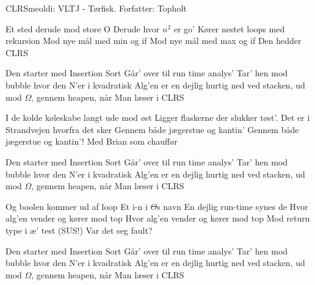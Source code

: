 \begin{sang}{CLRS}{meoldi: VLTJ - Tørfisk. Forfatter: Topholt}
    \begin{vers}
    Et sted derude mod store O
    Derude hvor $n^2$ er go'
    Kører nestet loops med rekursion
    Mod nye mål med min og if
    Mod nye mål med max og if
    Den hedder CLRS
    \end{vers}
    
    \begin{omkvaed}
    Den starter med Insertion Sort
    Går' over til run time analys' 
    Tar' hen mod bubble hvor den N'er i kvadratisk
    Alg'en er en dejlig hurtig ned ved stacken, ud mod $\Omega$, gennem heapen, når
    Man læser i CLRS
    \end{omkvaed}
    
    \begin{vers}
    I de kolde køleskabe langt ude mod øst
    Ligger flaskerne der slukker tøst'.
    Det er i Strandvejen hvorfra det sker
    Gennem både jægerstue og kantin'
    Gennem både jægerstue og kantin'!
    Med Brian som chauffør
    \end{vers}
    
    \begin{omkvaed}
    Den starter med Insertion Sort
    Går' over til run time analys' 
    Tar' hen mod bubble hvor den N'er i kvadratisk
    Alg'en er en dejlig hurtig ned ved stacken, ud mod $\Omega$, gennem heapen, når
    Man læser i CLRS
    \end{omkvaed}
    
    \begin{vers}
    Og boolen kommer ud af loop
    Et i-n i $\Theta$s navn
    En dejlig run-time synes de
    Hvor alg'en vender og kører mod top
    Hvor alg'en vender og kører mod top
    Mod return type i æ' test (SUS!)
    Var det seg fault?
    \end{vers}
    
    \begin{omkvaed}
    Den starter med Insertion Sort
    Går' over til run time analys' 
    Tar' hen mod bubble hvor den N'er i kvadratisk
    Alg'en er en dejlig hurtig ned ved stacken, ud mod $\Omega$, gennem heapen, når
    Man læser i CLRS
    \end{omkvaed}
    \end{sang}